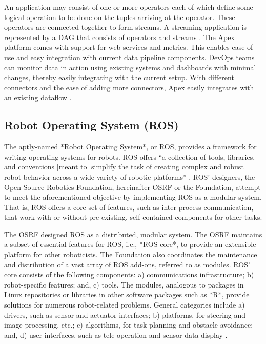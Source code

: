      An application may consist of one or more operators each of which
     define some logical operation to be done on the tuples arriving
     at the operator. These operators are connected together to form
     streams. A streaming application is represented by a DAG that
     consists of operators and streams \cite{apex-operators}. The
     Apex platform comes with support for web services and
     metrics. This enables ease of use and easy integration with
     current data pipeline components. DevOps teams can monitor data
     in action using existing systems and dashboards with minimal
     changes, thereby easily integrating with the current setup. With
     different connectors and the ease of adding more connectors, Apex
     easily integrates with an existing dataflow \cite{apex-ease}.

\subsection{ Robot Operating System (ROS)}

     The aptly-named *Robot Operating System*, or ROS, provides a
     framework for writing operating systems for robots.  ROS offers ``a 
     collection of tools, libraries, and conventions [meant to] simplify the 
     task of creating complex and robust robot behavior across a wide variety 
     of robotic platforms'' \cite{www-ros-about}. ROS' designers, the Open 
     Source Robotics Foundation, hereinafter OSRF or the Foundation, attempt 
     to meet the aforementioned objective by implementing ROS as a modular 
     system.  That is, ROS offers a core set of features, such as 
     inter-process communication, that work with or without pre-existing, 
     self-contained components for other tasks.

     The OSRF designed ROS as a distributed, modular system.  The OSRF 
     maintains a subset of essential features for ROS, i.e., *ROS 
     core*, to provide an extensible platform for other roboticists.  The 
     Foundation also coordinates the maintenance and distribution of a vast 
     array of ROS add-ons, referred to as modules.  ROS' core consists of the 
     following components: a) communications infrastructure; b) robot-specific 
     features; and, c) tools.  The modules, analogous to packages in Linux 
     repositories or libraries in other software packages such as *R*, 
     provide solutions for numerous robot-related problems.  General 
     categories include a) drivers, such as sensor and actuator interfaces; b) 
     platforms, for steering and image processing, etc.; c) algorithms, for 
     task planning and obstacle avoidance; and, d) user interfaces, such as 
     tele-operation and sensor data display \cite{www-software-categories}.


